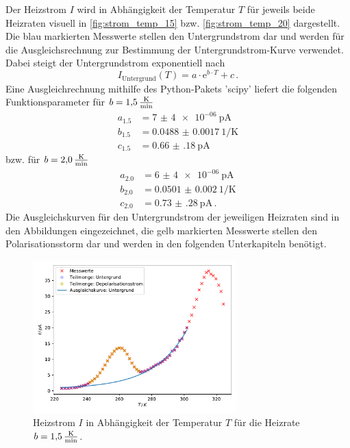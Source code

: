 Der Heizstrom $I$ wird in Abhängigkeit der Temperatur $T$ für jeweils beide Heizraten visuell in \autoref{fig:strom_temp_15} bzw. \autoref{fig:strom_temp_20} dargestellt.
Die blau markierten Messwerte stellen den Untergrundstrom dar und werden für die Ausgleichsrechnung zur Bestimmung der Untergrundstrom-Kurve verwendet.
Dabei steigt der Untergrundstrom exponentiell nach
\begin{equation}
    I_\text{Untergrund}(T) = a \cdot \mathrm{e}^{b\cdot T} + c \, .
    \label{eqn:untergrund}
\end{equation}
Eine Ausgleichrechnung mithilfe des Python-Pakets 'scipy'\cite{scipy} liefert die folgenden Funktionsparameter für $b = \SI{1.5}{\frac{\kelvin}{\minute}}$
\begin{align*}
    a_{1.5} &= \SI{7(4)e-06}{\pico\ampere} \\
    b_{1.5} &= \SI{0.0488(17)}{1 / \kelvin} \\
    c_{1.5} &= \SI{0.66(18)}{\pico\ampere}
\end{align*}
bzw. für $b = \SI{2.0}{\frac{\kelvin}{\minute}}$
\begin{align*}
    a_{2.0} &= \SI{6(4)e-06}{\pico\ampere} \\
    b_{2.0} &= \SI{0.0501(20)}{1 / \kelvin} \\
    c_{2.0} &= \SI{0.73(28)}{\pico\ampere} \, .
\end{align*}
Die Ausgleichskurven für den Untergrundstrom der jeweiligen Heizraten sind in den Abbildungen eingezeichnet, die gelb markierten Messwerte stellen den Polarisationsstorm dar und werden in den folgenden Unterkapiteln benötigt. 

\begin{figure}
    \centering
    \includegraphics[width=0.7\textwidth]{content/data/T_I_kurve_15.pdf}
    \caption{Heizstrom $I$ in Abhängigkeit der Temperatur $T$ für die Heizrate $b = \SI{1.5}{\frac{\kelvin}{\minute}}$. \cite{numpy}\cite{matplotlib}\cite{scipy}}
    \label{fig:strom_temp_15}
\end{figure}

